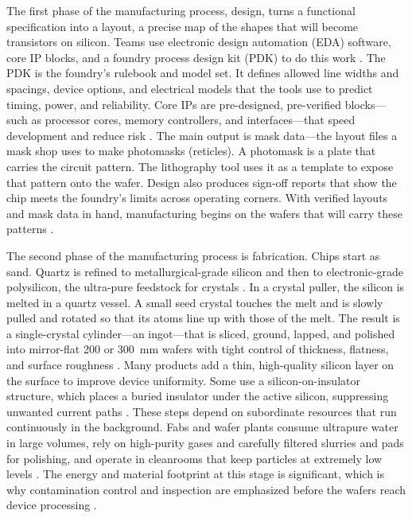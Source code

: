 The first phase of the manufacturing process, design, turns a functional specification into a layout, a precise map of the shapes that will become transistors on silicon. Teams use electronic design automation (EDA) software, core IP blocks, and a foundry process design kit (PDK) to do this work \parencite{kahng_vlsi_2011,weste_cmos_2011}. The PDK is the foundry's rulebook and model set. It defines allowed line widths and spacings, device options, and electrical models that the tools use to predict timing, power, and reliability. Core IPs are pre-designed, pre-verified blocks---such as processor cores, memory controllers, and interfaces---that speed development and reduce risk \parencite{varas_strengthening_2021,khan_semiconductor_2021}. The main output is mask data---the layout files a mask shop uses to make photomasks (reticles). A photomask is a plate that carries the circuit pattern. The lithography tool uses it as a template to expose that pattern onto the wafer. Design also produces sign-off reports that show the chip meets the foundry's limits across operating corners. With verified layouts and mask data in hand, manufacturing begins on the wafers that will carry these patterns \parencite{kahng_vlsi_2011,weste_cmos_2011}.

The second phase of the manufacturing process is fabrication. Chips start as sand. Quartz is refined to metallurgical-grade silicon and then to electronic-grade polysilicon, the ultra-pure feedstock for crystals \parencite{us_geological_survey_mineral_2024,van_zant_microchip_2014}. In a crystal puller, the silicon is melted in a quartz vessel. A small seed crystal touches the melt and is slowly pulled and rotated so that its atoms line up with those of the melt. The result is a single-crystal cylinder---an ingot---that is sliced, ground, lapped, and polished into mirror-flat 200 or 300~mm wafers with tight control of thickness, flatness, and surface roughness \parencite{van_zant_microchip_2014,nishi_handbook_2007}. Many products add a thin, high-quality silicon layer on the surface to improve device uniformity. Some use a silicon-on-insulator structure, which places a buried insulator under the active silicon, suppressing unwanted current paths \parencite{nishi_handbook_2007}. These steps depend on subordinate resources that run continuously in the background. Fabs and wafer plants consume ultrapure water in large volumes, rely on high-purity gases and carefully filtered slurries and pads for polishing, and operate in cleanrooms that keep particles at extremely low levels \parencite{van_zant_microchip_2014,noauthor_iso_2015}. The energy and material footprint at this stage is significant, which is why contamination control and inspection are emphasized before the wafers reach device processing \parencite{williams_17kg_2002, van_zant_microchip_2014, irds_factory_integration_technical_working_group_international_2023}.

